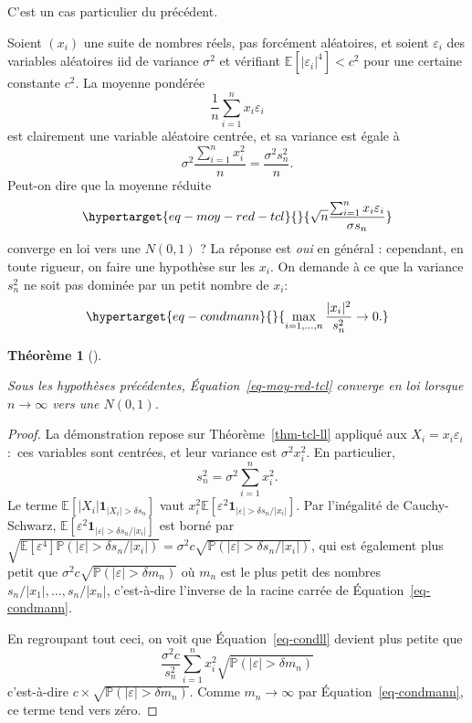 \documentclass[
  10,
  letterpaper,
  DIV=11,
  numbers=noendperiod]{scrreport}
\theoremstyle{plain}
\newtheorem{theorem}{Théorème}[chapter]
\theoremstyle{definition}
\theoremstyle{plain}
\theoremstyle{definition}
\theoremstyle{definition}
\theoremstyle{plain}
\theoremstyle{remark}
\begin{document}
C'est un cas particulier du précédent.

Soient \((x_i)\) une suite de nombres réels, pas forcément aléatoires,
et soient \(\varepsilon_i\) des variables aléatoires iid de variance
\(\sigma^2\) et vérifiant \(\mathbb{E}[|\varepsilon_i|^4]<c^2\) pour une
certaine constante \(c^2\). La moyenne pondérée
\[\frac{1}{n}\sum_{i=1}^n x_i \varepsilon_i\] est clairement une
variable aléatoire centrée, et sa variance est égale à
\[\sigma^2 \frac{\sum_{i=1}^n x_i^2}{n} = \frac{\sigma^2 s_n^2}{n}. \]
Peut-on dire que la moyenne réduite
\begin{equation}\protect\hypertarget{eq-moy-red-tcl}{}{ \sqrt{n}\frac{\sum_{i=1}^n x_i \varepsilon_i}{\sigma s_n}}\label{eq-moy-red-tcl}\end{equation}
converge en loi vers une \(N(0,1)\) ? La réponse est \emph{oui} en
général : cependant, en toute rigueur, on faire une hypothèse sur les
\(x_i\). On demande à ce que la variance \(s_n^2\) ne soit pas dominée
par un petit nombre de \(x_i\):
\begin{equation}\protect\hypertarget{eq-condmann}{}{\max_{i=1, \dotsc, n} \frac{|x_i|^2}{s_n^2} \to 0. }\label{eq-condmann}\end{equation}

\begin{theorem}[]\protect\hypertarget{thm-mann-wald}{}\label{thm-mann-wald}

Sous les hypothèses précédentes, Équation~\ref{eq-moy-red-tcl} converge
en loi lorsque \(n\to\infty\) vers une \(N(0,1)\).

\end{theorem}

\begin{proof}

La démonstration repose sur Théorème~\ref{thm-tcl-ll} appliqué aux
\(X_i = x_i \varepsilon_i\) :~ces variables sont centrées, et leur
variance est \(\sigma^2 x_i^2\). En particulier,
\[s_n^2 = \sigma^2 \sum_{i=1}^n x_i^2.\] Le terme
\(\mathbb{E}[|X_i|\mathbf{1}_{|X_i|>\delta s_n}]\) vaut
\(x_i^2 \mathbb{E}[\varepsilon^2 \mathbf{1}_{|\varepsilon|>\delta s_n / |x_i|}]\).
Par l'inégalité de Cauchy-Schwarz,
\(\mathbb{E}[\varepsilon^2 \mathbf{1}_{|\varepsilon|>\delta s_n / |x_i|}]\)
est borné par
\(\sqrt{\mathbb{E}[\varepsilon^4]\mathbb{P}(|\varepsilon|>\delta s_n / |x_i|)} = \sigma^2 c \sqrt{\mathbb{P}(|\varepsilon|> \delta s_n / |x_i|)}\),
qui est également plus petit que
\(\sigma^2 c \sqrt{\mathbb{P}(|\varepsilon|>\delta m_n)}\) où \(m_n\)
est le plus petit des nombres \(s_n/|x_1|, \dotsc, s_n/|x_n|\),
c'est-à-dire l'inverse de la racine carrée de
Équation~\ref{eq-condmann}.

En regroupant tout ceci, on voit que Équation~\ref{eq-condll} devient
plus petite que
\[\frac{\sigma^2 c}{s_n^2}\sum_{i=1}^n x_i^2\sqrt{\mathbb{P}(|\varepsilon|>\delta m_n)}\]
c'est-à-dire \(c\times \sqrt{\mathbb{P}(|\varepsilon|>\delta m_n)}\).
Comme \(m_n\to \infty\) par Équation~\ref{eq-condmann}, ce terme tend
vers zéro.

\end{proof}
\end{document}
